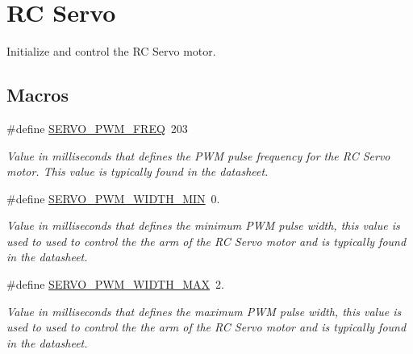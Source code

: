 \hypertarget{group__rc__servo}{\section{R\-C Servo}
\label{group__rc__servo}
}


Initialize and control the R\-C Servo motor.  


\subsection*{Macros}
\begin{DoxyCompactItemize}
\item 
\hypertarget{group__rc__servo_ga0eb250599505bd3600d26b6bad6a415f}{\#define \hyperlink{group__rc__servo_ga0eb250599505bd3600d26b6bad6a415f}{S\-E\-R\-V\-O\-\_\-\-P\-W\-M\-\_\-\-F\-R\-E\-Q}~203}\label{group__rc__servo_ga0eb250599505bd3600d26b6bad6a415f}

\begin{DoxyCompactList}\small\item\em Value in milliseconds that defines the P\-W\-M pulse frequency for the R\-C Servo motor. This value is typically found in the datasheet. \end{DoxyCompactList}\item 
\hypertarget{group__rc__servo_ga95ba539b3e71a70655a714c95eb046c0}{\#define \hyperlink{group__rc__servo_ga95ba539b3e71a70655a714c95eb046c0}{S\-E\-R\-V\-O\-\_\-\-P\-W\-M\-\_\-\-W\-I\-D\-T\-H\-\_\-\-M\-I\-N}~0.}\label{group__rc__servo_ga95ba539b3e71a70655a714c95eb046c0}

\begin{DoxyCompactList}\small\item\em Value in milliseconds that defines the minimum P\-W\-M pulse width, this value is used to used to control the the arm of the R\-C Servo motor and is typically found in the datasheet. \end{DoxyCompactList}\item 
\hypertarget{group__rc__servo_ga547c363d5ea2c04b34b9ed60a1e9325f}{\#define \hyperlink{group__rc__servo_ga547c363d5ea2c04b34b9ed60a1e9325f}{S\-E\-R\-V\-O\-\_\-\-P\-W\-M\-\_\-\-W\-I\-D\-T\-H\-\_\-\-M\-A\-X}~2.}\label{group__rc__servo_ga547c363d5ea2c04b34b9ed60a1e9325f}

\begin{DoxyCompactList}\small\item\em Value in milliseconds that defines the maximum P\-W\-M pulse width, this value is used to used to control the the arm of the R\-C Servo motor and is typically found in the datasheet. \end{DoxyCompactList}\end{DoxyCompactItemize}
